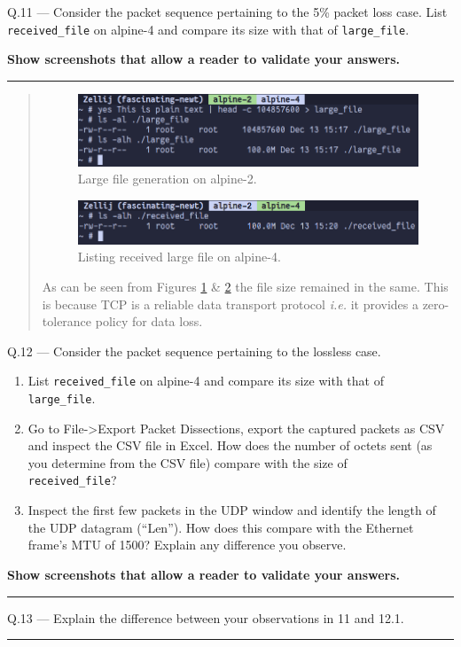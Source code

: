 \documentclass{article}
\newcommand\Que[2]{%
   \begin{samepage}
   \leavevmode\par
   \noindent
   Q.#1 --- #2\par\vspace{10pt}\hrule\vspace{10pt}
   \end{samepage}}
\newenvironment{ans}
   {\fbox{Answer}\begin{quote}\nopagebreak}
   {\end{quote}}
\newcommand\ie{\emph{i.e.}}
\begin{document}
\Que{11}{
Consider the packet sequence pertaining to the 5\% packet loss
case. List \texttt{received\_file} on alpine-4 and compare its
size with that of \texttt{large\_file}.

\textbf{Show screenshots that allow a reader to validate your
answers.}}
\begin{ans}
\begin{figure}[H]
\centering
\includegraphics[width=16cm]{data/large-file-alpine-2.png}
\caption{Large file generation on alpine-2.}
\label{fig:file-gen}
\end{figure}

\begin{figure}[H]
\centering
\includegraphics[width=16cm]{data/alpine-4-received-file.png}
\caption{Listing received large file on alpine-4.}
\label{fig:file-receive}
\end{figure}

As can be seen from Figures \ref{fig:file-gen} \& \ref{fig:file-receive} the
file size remained in the same. This is because TCP is a reliable data transport
protocol \ie{} it provides a zero-tolerance policy for data loss.
\end{ans}

\Que{12}{
Consider the packet sequence pertaining to the lossless case.
\begin{enumerate}
\item List \texttt{received\_file} on alpine-4 and compare its
      size with that of \\ \texttt{large\_file}.
\item Go to File->Export Packet Dissections, export the captured
      packets as CSV and inspect the CSV file in Excel. How does
      the number of octets sent (as you determine from the CSV
      file) compare with the size of\\ \texttt{received\_file}?
\item Inspect the first few packets in the UDP window and
      identify the length of the UDP datagram (``Len''). How does
      this compare with the Ethernet frame's MTU of 1500? Explain
      any difference you observe.
\end{enumerate}

\textbf{Show screenshots that allow a reader to validate your answers.}}

\begin{ans}

\end{ans}

\Que{13}{Explain the difference between your observations in 11
and 12.1.}
\end{document}
